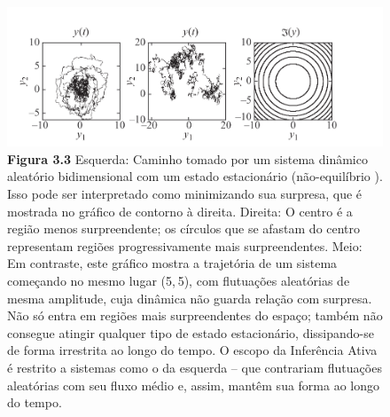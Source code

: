 \documentclass[
  12pt,
]{book}
\begin{document}
\begin{figure}
\centering
\includegraphics{images/Figura_3_3.png}
\caption[\textbf{Figura 3.3} Esquerda: Caminho tomado por um sistema dinâmico aleatório bidimensional com um estado estacionário (não-equilíbrio ). Isso pode ser interpretado como minimizando sua surpresa, que é mostrada no gráfico de contorno à direita. Direita: O centro é a região menos surpreendente; os círculos que se afastam do centro representam regiões progressivamente mais surpreendentes. Meio: Em contraste, este gráfico mostra a trajetória de um sistema começando no mesmo lugar (5, 5), com flutuações aleatórias de mesma amplitude, cuja dinâmica não guarda relação com surpresa. Não só entra em regiões mais surpreendentes do espaço; também não consegue atingir qualquer tipo de estado estacionário, dissipando-se de forma irrestrita ao longo do tempo. O escopo da Inferência Ativa é restrito a sistemas como o da esquerda -- que contrariam flutuações aleatórias com seu fluxo médio e, assim, mantêm sua forma ao longo do tempo.]{\textbf{Figura 3.3} Esquerda: Caminho tomado por um sistema dinâmico aleatório bidimensional com um estado estacionário (não-equilíbrio \footnotemark{}). Isso pode ser interpretado como minimizando sua surpresa, que é mostrada no gráfico de contorno à direita. Direita: O centro é a região menos surpreendente; os círculos que se afastam do centro representam regiões progressivamente mais surpreendentes. Meio: Em contraste, este gráfico mostra a trajetória de um sistema começando no mesmo lugar (5, 5), com flutuações aleatórias de mesma amplitude, cuja dinâmica não guarda relação com surpresa. Não só entra em regiões mais surpreendentes do espaço; também não consegue atingir qualquer tipo de estado estacionário, dissipando-se de forma irrestrita ao longo do tempo. O escopo da Inferência Ativa é restrito a sistemas como o da esquerda -- que contrariam flutuações aleatórias com seu fluxo médio e, assim, mantêm sua forma ao longo do tempo.}
\end{figure}
\end{document}
